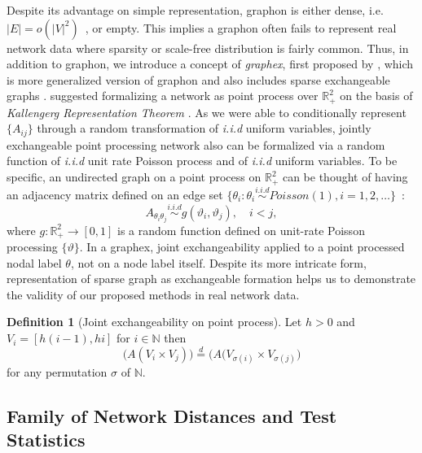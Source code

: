 \documentclass[12pt]{article}
\theoremstyle{definition}
\newtheorem{definition}{Definition}[section]
\begin{document}
Despite its advantage on simple representation, graphon is either dense, i.e. $|E| = o(|V|^2)$~\citep{veitch2015class}, or empty. This implies a graphon often fails to represent real network data where sparsity or scale-free distribution is fairly common. Thus, in addition to graphon, we introduce a concept of \textit{graphex}, first proposed by \cite{veitch2015class}, which is more generalized version of graphon and also includes sparse exchangeable graphs \citep{caron2014sparse}.  \cite{caron2014sparse} suggested formalizing a network as point process over $\mathbb{R}^2_{+}$ on the basis of \textit{Kallengerg Representation Theorem} \citep{kallenberg1990exchangeable}. As we were able to conditionally represent $\{ A_{ij} \}$ through a random transformation of \textit{i.i.d} uniform variables, jointly exchangeable point processing network also can be formalized via a random function of \textit{i.i.d} unit rate Poisson process and of \textit{i.i.d} uniform variables. 
To be specific, an undirected graph on a point process on $\mathbb{R}^2_{+}$ can be thought of having an adjacency matrix defined on an edge set $\{ \theta_{i} :  \theta_{i}  \overset{i.i.d}{\sim}  Poisson(1), i = 1,2,\ldots \}$~\citep{kallenberg1990exchangeable}:
\begin{equation}
A_{\theta_{i} \theta_{j}} \overset{i.i.d}{\sim} g(\vartheta_{i}, \vartheta_{j}), \quad i < j,
\label{eq:graphon}
\end{equation}
where $g : \mathbb{R}^{2}_{+} \rightarrow [0,1]$ is a random function defined on unit-rate Poisson processing $\{ \vartheta \}$. In a graphex, joint exchangeability applied to a point processed nodal label $\theta$, not on a node label itself. Despite its more intricate form, representation of sparse graph as exchangeable formation helps us to demonstrate the validity of our proposed methods in real network data. 
\begin{definition}[Joint exchangeability on point process]
	\label{point}
	Let $h > 0$ and  $V_{i} = [h(i-1), hi ]$ for $i \in \mathbb{N}$ then
	\begin{equation}
	\big( A( V_{i} \times V_{j}  )   \big)  \stackrel{d}{=} \big( A( V_{\sigma(i)} \times V_{\sigma(j)}     \big)
	\end{equation}	
	for any permutation $\sigma$ of $\mathbb{N}$.		
\end{definition}

\subsection{Family of Network Distances and Test Statistics}	
\end{document}
